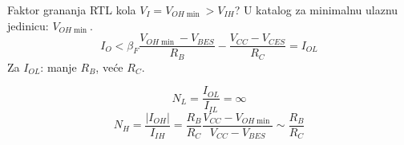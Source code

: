 \begin{frame}[label=10-s027]{Faktor grananja RTL kola}
\setlength{\abovedisplayskip}{4pt}\setlength{\belowdisplayskip}{4pt}\setlength{\abovedisplayshortskip}{3pt}\setlength{\belowdisplayshortskip}{3pt}
$V_I=V_{OH\min}>V_{IH}$? U katalog za minimalnu ulaznu jedinicu: $V_{OH\min}$.
\[I_O<\beta_F\frac{V_{OH\min}-V_{BES}}{R_B}-\frac{V_{CC}-V_{CES}}{R_C}=I_{OL}\]
Za $I_{OL}$: manje $R_B$, veće $R_C$.\par\bigskip
\[N_L=\frac{I_{OL}}{I_{IL}}=\infty\]
\[N_H=\frac{|I_{OH}|}{I_{IH}}=\frac{R_B}{R_C}\frac{V_{CC}-V_{OH\min}}{V_{CC}-V_{BES}}\sim\frac{R_B}{R_C}\]
\end{frame}
